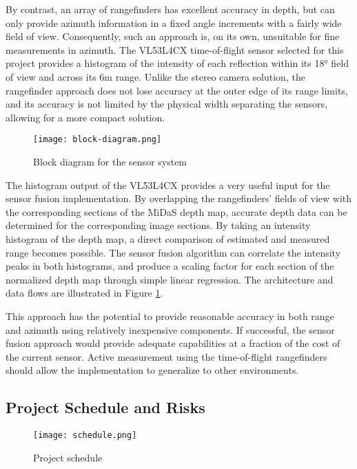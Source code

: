 \documentclass[conference]{IEEEtran}
\begin{document}
By contrast, an array of rangefinders has excellent accuracy in depth, but can
only provide azimuth information in a fixed angle increments with a fairly wide
field of view. Consequently, such an approach is, on its own, unsuitable for
fine measurements in azimuth. The VL53L4CX time-of-flight sensor selected for
this project provides a histogram of the intensity of each reflection within
its 18° field of view and across its 6m range. Unlike the stereo camera
solution, the rangefinder approach does not lose accuracy at the outer edge of
its range limits, and its accuracy is not limited by the physical width
separating the sensors, allowing for a more compact solution.

\begin{figure}
\centering
\texttt{[image: block-diagram.png]}
\caption{Block diagram for the sensor system}
\label{fig:block-diagram}
\end{figure}

\FloatBarrier

The histogram output of the VL53L4CX provides a very useful input for the
sensor fusion implementation. By overlapping the rangefinders' fields of view
with the corresponding sections of the MiDaS depth map, accurate depth data can
be determined for the corresponding image sections. By taking an intensity
histogram of the depth map, a direct comparison of estimated and measured range
becomes possible. The sensor fusion algorithm can correlate the intensity peaks
in both histograms, and produce a scaling factor for each section of the
normalized depth map through simple linear regression. The architecture and
data flows are illustrated in Figure \ref{fig:block-diagram}.

This approach has the potential to provide reasonable accuracy in both range
and azimuth using relatively inexpensive components. If successful, the sensor
fusion approach would provide adequate capabilities at a fraction of the cost
of the current sensor. Active measurement using the time-of-flight rangefinders
should allow the implementation to generalize to other environments.


\subsection{Project Schedule and Risks}

\FloatBarrier

\begin{figure}
\centering
\texttt{[image: schedule.png]}
\caption{Project schedule}
\label{fig:schedule}
\end{figure}
\end{document}
